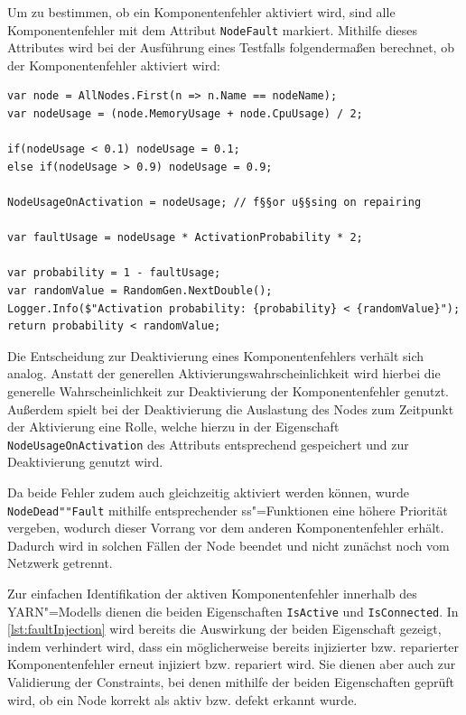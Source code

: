 Um zu bestimmen, ob ein Komponentenfehler aktiviert wird, sind alle Komponentenfehler mit dem Attribut \texttt{NodeFault} markiert.
Mithilfe dieses Attributes wird bei der Ausführung eines Testfalls folgendermaßen berechnet, ob der Komponentenfehler aktiviert wird:

\begin{lstlisting}[label=lst:faultActivationCalc,style=cs,
caption={[Berechnung der Aktivierung von Komponentenfehlern]
    Berechnung der Aktivierung von Komponentenfehlern (zusammengefasst).}]
var node = AllNodes.First(n => n.Name == nodeName);
var nodeUsage = (node.MemoryUsage + node.CpuUsage) / 2;

if(nodeUsage < 0.1) nodeUsage = 0.1;
else if(nodeUsage > 0.9) nodeUsage = 0.9;

NodeUsageOnActivation = nodeUsage; // f§§or u§§sing on repairing

var faultUsage = nodeUsage * ActivationProbability * 2;

var probability = 1 - faultUsage;
var randomValue = RandomGen.NextDouble();
Logger.Info($"Activation probability: {probability} < {randomValue}");
return probability < randomValue;
\end{lstlisting}

Die Entscheidung zur Deaktivierung eines Komponentenfehlers verhält sich analog.
Anstatt der generellen Aktivierungswahrscheinlichkeit wird hierbei die generelle Wahrscheinlichkeit zur Deaktivierung der Komponentenfehler genutzt.
Außerdem spielt bei der Deaktivierung die Auslastung des Nodes zum Zeitpunkt der Aktivierung eine Rolle, welche hierzu in der Eigenschaft \texttt{NodeUsageOnActivation} des Attributs entsprechend gespeichert und zur Deaktivierung genutzt wird.

Da beide Fehler zudem auch gleichzeitig aktiviert werden können, wurde \texttt{NodeDead""Fault} mithilfe entsprechender \ac{ss}"=Funktionen eine höhere Priorität vergeben, wodurch dieser Vorrang vor dem anderen Komponentenfehler erhält.
Dadurch wird in solchen Fällen der Node beendet und nicht zunächst noch vom Netzwerk getrennt.

Zur einfachen Identifikation der aktiven Komponentenfehler innerhalb des \ac{YARN}"=Modells dienen die beiden Eigenschaften \texttt{IsActive} und \texttt{IsConnected}.
In \cref{lst:faultInjection} wird bereits die Auswirkung der beiden Eigenschaft gezeigt, indem verhindert wird, dass ein möglicherweise bereits injizierter bzw. reparierter Komponentenfehler erneut injiziert bzw. repariert wird.
Sie dienen aber auch zur Validierung der Constraints, bei denen mithilfe der beiden Eigenschaften geprüft wird, ob ein Node korrekt als aktiv bzw. defekt erkannt wurde.

